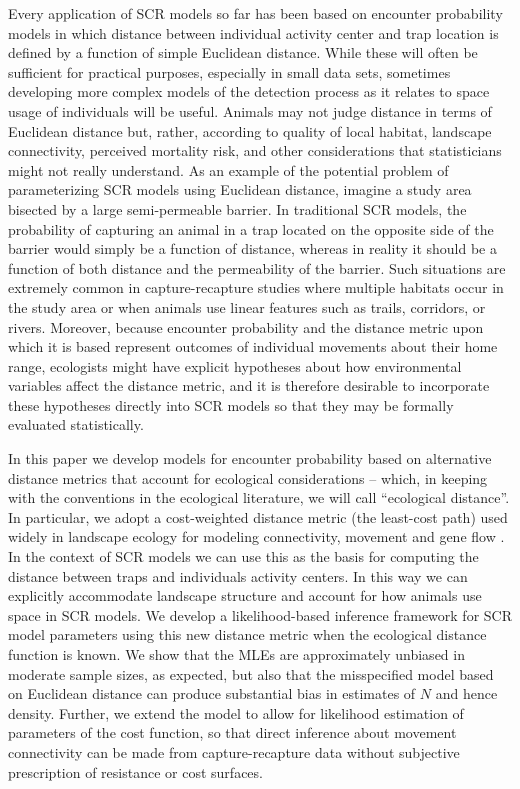 \documentclass[12pt]{article}
\begin{document}
\begin{spacing}{1.8}
Every application of SCR models so far has been based on encounter
probability models in which distance between individual activity
center and trap location is defined by a function of simple Euclidean
distance.  While these will often be sufficient for practical
purposes, especially in small data sets, sometimes developing more
complex models of the detection process as it relates to space usage
of individuals will be useful.  Animals may not judge distance in
terms of Euclidean distance but, rather, according to quality of local
habitat, landscape connectivity, perceived mortality risk, and other
considerations that statisticians might not really
understand.
As an example of the potential problem of parameterizing SCR models
using Euclidean distance, imagine a study area bisected by a large
semi-permeable barrier. In traditional SCR models, the probability of
capturing an animal in a trap located on the opposite side of the
barrier would simply be a function of distance, whereas in reality it
should be a function of both distance and the permeability of the
barrier. Such situations are extremely common in capture-recapture
studies where multiple habitats occur in the study area or when
animals use linear features such as trails, corridors, or rivers.
 Moreover, because encounter probability and the distance
metric upon which it is based represent outcomes of individual
movements about their home range, ecologists might have explicit
hypotheses about how environmental variables affect the distance
metric, and it is therefore desirable to incorporate these hypotheses
directly into SCR models so that they may be formally evaluated
statistically.




In this paper we develop models for encounter probability based on
alternative distance metrics that account for ecological
considerations -- which, in keeping with the conventions in the
ecological literature, we will call ``ecological distance''. In
particular, we adopt a cost-weighted distance metric (the least-cost path)
used widely in landscape ecology for modeling connectivity,
movement and gene flow
\citep{adriaensen_etal:2003,manel_etal:2003,mcrae_etal:2008}. In the
context of SCR models we can use this as the basis for computing the
distance between traps and individuals activity centers. In this way
we can explicitly accommodate landscape structure and
account for how animals use space in SCR models. We develop a
likelihood-based inference framework for SCR model parameters using
this new distance metric when the ecological distance function is
known.  We show that the MLEs are approximately unbiased in moderate
sample sizes, as expected, but also that the misspecified model based
on Euclidean distance can produce substantial bias in estimates of $N$
and hence density.  Further, we extend the model to allow for likelihood 
estimation of parameters of the cost function, so that direct inference
about movement connectivity can be made from capture-recapture data without subjective prescription
of resistance or cost surfaces.



\end{spacing}
\end{document}
